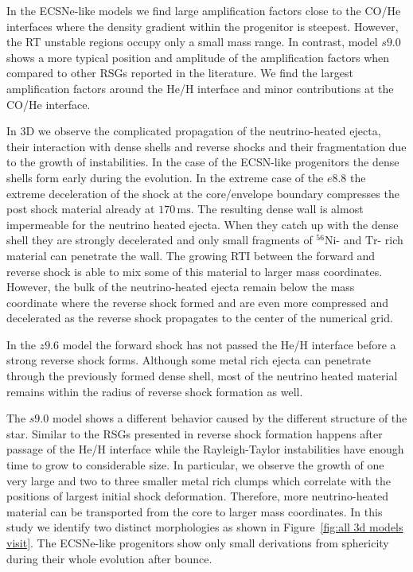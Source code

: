 \documentclass[fleqn,usenatbib]{mnras}
\newcommand{\nickel}{\ensuremath{\mathrm{^{56}Ni}}\xspace}
\newcommand{\tracer}{\ensuremath{\mathrm{Tr}}\xspace}
\newcommand{\ms}{\ensuremath{\text{ms}}}
\begin{document}
In the ECSNe-like models we find large amplification factors close to the CO/He 
interfaces where the density gradient within the progenitor is steepest. 
However, the RT unstable regions occupy only a small mass range.
In contrast, model $s9.0$ shows a more typical position and amplitude of the 
amplification factors when compared to other RSGs reported in the literature.
We find the largest amplification factors around the He/H 
interface and minor contributions at the CO/He interface.

In 3D we observe the complicated propagation of the neutrino-heated ejecta, 
their interaction with dense shells and reverse shocks and their
fragmentation due to the growth of instabilities.
In the case of the ECSN-like progenitors the dense shells form 
early during the evolution. 
In the extreme case of the $e8.8$ the 
extreme deceleration of the shock at the core/envelope boundary compresses 
the post shock material already at $170 \, \ms$. The resulting dense wall 
is almost impermeable for the neutrino heated ejecta. When they catch
up with the dense shell they are strongly decelerated and only small
fragments of \nickel- and \tracer- rich material can penetrate the wall.
The growing RTI between the forward and reverse shock is able to mix some
of this material to larger mass coordinates.
However, the bulk of the neutrino-heated ejecta remain below the mass 
coordinate where the reverse shock formed and are even more compressed
and decelerated as the reverse shock propagates to the center of the numerical
grid.

In the $z9.6$ model the forward shock has not passed the He/H interface 
before a strong reverse shock forms. Although some metal rich ejecta can 
penetrate through the previously formed dense shell, most of the neutrino 
heated material remains within the radius of reverse shock formation as well.

The $s9.0$ model shows a different behavior caused by the different structure 
of the star. Similar to the RSGs presented in \cite{Wongwathanarat2015} reverse 
shock formation happens after passage of the He/H interface while the Rayleigh-Taylor 
instabilities have enough time to grow to considerable size. 
In particular, we observe the growth of one very large and two to three smaller 
metal rich clumps which correlate with the positions of largest initial shock
deformation.
Therefore, more neutrino-heated material can be transported from the core 
to larger mass coordinates. 
In this study we identify two distinct morphologies as shown in Figure~\ref{fig:all 3d models visit}.
The ECSNe-like progenitors show only small derivations from sphericity 
during their whole evolution after bounce.
\end{document}
